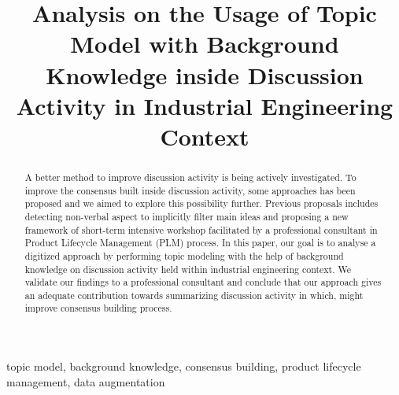 \documentclass[conference]{IEEEtran}
\begin{document}
\title{Analysis on the Usage of Topic Model with Background Knowledge inside Discussion Activity in Industrial Engineering Context}

\author{
}

\maketitle

\begin{abstract}
A better method to improve discussion activity is being actively investigated. To improve the consensus built inside discussion activity, some approaches has been proposed and we aimed to explore this possibility further. Previous proposals includes detecting non-verbal aspect to implicitly filter main ideas and proposing a new framework of short-term intensive workshop facilitated by a professional consultant in Product Lifecycle Management (PLM) process. In this paper, our goal is to analyse a digitized approach by performing topic modeling with the help of background knowledge on discussion activity held within industrial engineering context. We validate our findings to a professional consultant and conclude that our approach gives an adequate contribution  towards summarizing discussion activity in which, might improve consensus building process.
\end{abstract}

\begin{IEEEkeywords}
topic model, background knowledge, consensus building, product lifecycle management, data augmentation
\end{IEEEkeywords}
\end{document}
